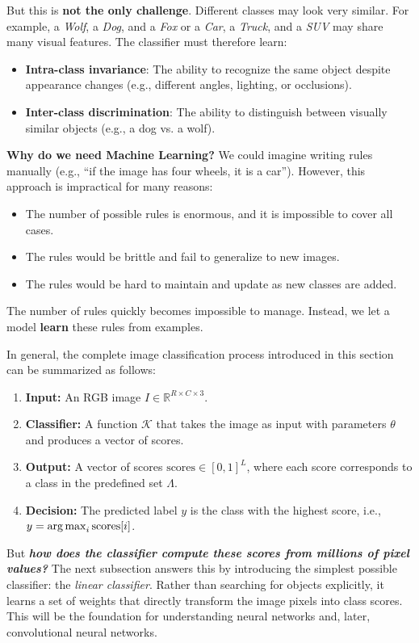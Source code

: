 \highspace
But this is \textbf{not the only challenge}. Different classes may look very similar. For example, a \emph{Wolf}, a \emph{Dog}, and a \emph{Fox} or a \emph{Car}, a \emph{Truck}, and a \emph{SUV} may share many visual features. The classifier must therefore learn:
\begin{itemize}
    \item \textbf{Intra-class invariance}: The ability to recognize the same object despite appearance changes (e.g., different angles, lighting, or occlusions).
    \item \textbf{Inter-class discrimination}: The ability to distinguish between visually similar objects (e.g., a dog vs. a wolf).
\end{itemize}

\highspace
\textcolor{Green3}{ \textbf{Why do we need Machine Learning?}} We could imagine writing rules manually (e.g., ``if the image has four wheels, it is a car''). However, this approach is impractical for many reasons:
\begin{itemize}
    \item The number of possible rules is enormous, and it is impossible to cover all cases.
    \item The rules would be brittle and fail to generalize to new images.
    \item The rules would be hard to maintain and update as new classes are added.
\end{itemize}
The number of rules quickly becomes impossible to manage. Instead, we let a model \textbf{learn} these rules from examples.

\highspace
In general, the complete image classification process introduced in this section can be summarized as follows:
\begin{enumerate}
    \item \textbf{Input:} An RGB image $I \in \mathbb{R}^{R \times C \times 3}$.
    \item \textbf{Classifier:} A function $\mathcal{K}$ that takes the image as input with parameters $\theta$ and produces a vector of scores.
    \item \textbf{Output:} A vector of scores $\text{scores} \in \left[0,1\right]^{L}$, where each score corresponds to a class in the predefined set $\Lambda$.
    \item \textbf{Decision:} The predicted label $y$ is the class with the highest score, i.e., $y = \operatorname*{arg\,max}_{i} \text{scores}[i]$.
\end{enumerate}

\highspace
But \textbf{\emph{how does the classifier compute these scores from millions of pixel values?}} The next subsection answers this by introducing the simplest possible classifier: the \emph{linear classifier}. Rather than searching for objects explicitly, it learns a set of weights that directly transform the image pixels into class scores. This will be the foundation for understanding neural networks and, later, convolutional neural networks.